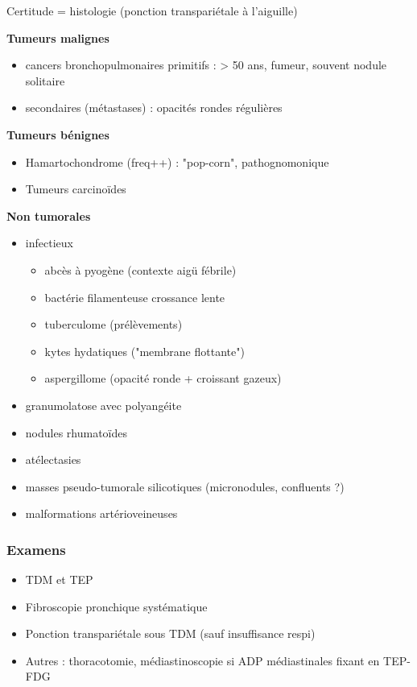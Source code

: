 \documentclass{book}
\begin{document}
Certitude = histologie (ponction transpariétale à l'aiguille)

\textbf{Tumeurs malignes}  

\begin{itemize}
\item cancers bronchopulmonaires primitifs : > 50 ans, fumeur, souvent nodule
solitaire
\item secondaires (métastases) : opacités rondes régulières
\end{itemize}


\textbf{Tumeurs bénignes} 

\begin{itemize}
\item Hamartochondrome (freq++) : "pop-corn", pathognomonique
\item Tumeurs  carcinoïdes
\end{itemize}


\textbf{Non tumorales}

\begin{itemize}
\item infectieux 

\begin{itemize}
\item abcès à pyogène (contexte aigü fébrile)
\item bactérie filamenteuse crossance lente
\item tuberculome (\thus prélèvements)
\item kytes hydatiques ("membrane flottante")
\item aspergillome (opacité ronde + croissant gazeux)
\end{itemize}

\item granumolatose avec polyangéite
\item nodules rhumatoïdes
\item atélectasies
\item masses pseudo-tumorale silicotiques (micronodules, confluents ?)
\item malformations artérioveineuses
\end{itemize}


\subsubsection{Examens}
\label{sec:org312e0d4}

\begin{itemize}
\item TDM et TEP
\item Fibroscopie pronchique systématique
\item Ponction transpariétale sous TDM (sauf insuffisance respi)
\item Autres : thoracotomie, médiastinoscopie si ADP médiastinales fixant en TEP-FDG
\end{itemize}
\end{document}
